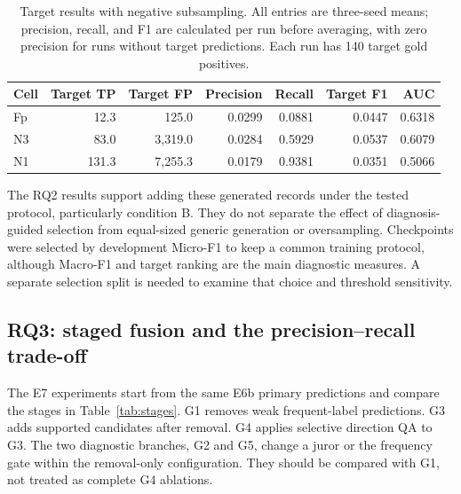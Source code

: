 \documentclass[12pt,a4paper]{article}
\begin{document}
\begin{table}[htbp]
\centering\small
\caption{Target results with negative subsampling. All entries are three-seed means; precision, recall, and F1 are calculated per run before averaging, with zero precision for runs without target predictions. Each run has 140 target gold positives.}
\label{tab:negatives}
\begin{tabularx}{\textwidth}{@{}Yrrrrrr@{}}
\toprule
Cell & Target TP & Target FP & Precision & Recall & Target F1 & AUC \\
\midrule
Fp & 12.3 & 125.0 & 0.0299 & 0.0881 & 0.0447 & 0.6318 \\
N3 & 83.0 & 3,319.0 & 0.0284 & 0.5929 & 0.0537 & 0.6079 \\
N1 & 131.3 & 7,255.3 & 0.0179 & 0.9381 & 0.0351 & 0.5066 \\
\bottomrule
\end{tabularx}
\end{table}

The RQ2 results support adding these generated records under the tested protocol, particularly condition B. They do not separate the effect of diagnosis-guided selection from equal-sized generic generation or oversampling. Checkpoints were selected by development Micro-F1 to keep a common training protocol, although Macro-F1 and target ranking are the main diagnostic measures. A separate selection split is needed to examine that choice and threshold sensitivity.

\subsection{RQ3: staged fusion and the precision--recall trade-off}
The E7 experiments start from the same E6b primary predictions and compare the stages in Table~\ref{tab:stages}. G1 removes weak frequent-label predictions. G3 adds supported candidates after removal. G4 applies selective direction QA to G3. The two diagnostic branches, G2 and G5, change a juror or the frequency gate within the removal-only configuration. They should be compared with G1, not treated as complete G4 ablations.
\end{document}
